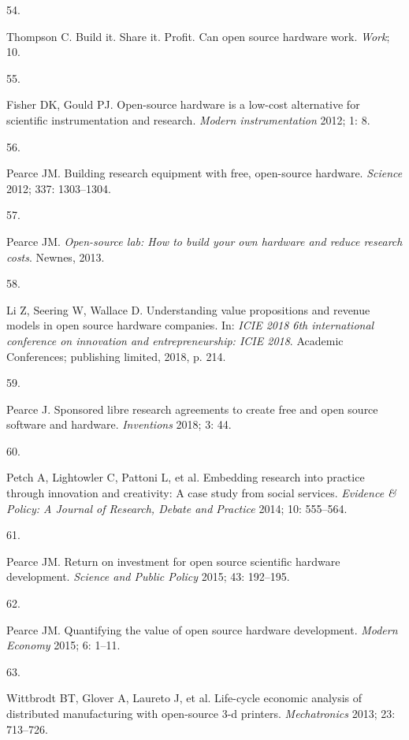 \documentclass[
  12pt,
  a4paperpaper,
  onecolumn]{article}
\newlength{\cslhangindent}
\newlength{\csllabelwidth}
\newlength{\cslentryspacingunit} %
\newenvironment{CSLReferences}[2] %
 {%
  \setlength{\parindent}{0pt}
  \ifodd #1
  \let\oldpar\par
  \def\par{\hangindent=\cslhangindent\oldpar}
  \fi
  \setlength{\parskip}{#2\cslentryspacingunit}
 }%
 {}
\newcommand{\CSLLeftMargin}[1]{\parbox[t]{\csllabelwidth}{#1}}
\newcommand{\CSLRightInline}[1]{\parbox[t]{\linewidth - \csllabelwidth}{#1}\break}
\begin{document}
\begin{CSLReferences}{0}{0}
\leavevmode{}%
\CSLLeftMargin{54. }%
\CSLRightInline{Thompson C. Build it. Share it. Profit. Can open source
hardware work. \emph{Work}; 10.}

\leavevmode{}%
\CSLLeftMargin{55. }%
\CSLRightInline{Fisher DK, Gould PJ. Open-source hardware is a low-cost
alternative for scientific instrumentation and research. \emph{Modern
instrumentation} 2012; 1: 8.}

\leavevmode{}%
\CSLLeftMargin{56. }%
\CSLRightInline{Pearce JM. Building research equipment with free,
open-source hardware. \emph{Science} 2012; 337: 1303--1304.}

\leavevmode{}%
\CSLLeftMargin{57. }%
\CSLRightInline{Pearce JM. \emph{Open-source lab: How to build your own
hardware and reduce research costs}. Newnes, 2013.}

\leavevmode{}%
\CSLLeftMargin{58. }%
\CSLRightInline{Li Z, Seering W, Wallace D. Understanding value
propositions and revenue models in open source hardware companies. In:
\emph{ICIE 2018 6th international conference on innovation and
entrepreneurship: ICIE 2018}. Academic Conferences; publishing limited,
2018, p. 214.}

\leavevmode{}%
\CSLLeftMargin{59. }%
\CSLRightInline{Pearce J. Sponsored libre research agreements to create
free and open source software and hardware. \emph{Inventions} 2018; 3:
44.}

\leavevmode{}%
\CSLLeftMargin{60. }%
\CSLRightInline{Petch A, Lightowler C, Pattoni L, et al. Embedding
research into practice through innovation and creativity: A case study
from social services. \emph{Evidence \& Policy: A Journal of Research,
Debate and Practice} 2014; 10: 555--564.}

\leavevmode{}%
\CSLLeftMargin{61. }%
\CSLRightInline{Pearce JM. Return on investment for open source
scientific hardware development. \emph{Science and Public Policy} 2015;
43: 192--195.}

\leavevmode{}%
\CSLLeftMargin{62. }%
\CSLRightInline{Pearce JM. Quantifying the value of open source hardware
development. \emph{Modern Economy} 2015; 6: 1--11.}

\leavevmode{}%
\CSLLeftMargin{63. }%
\CSLRightInline{Wittbrodt BT, Glover A, Laureto J, et al. Life-cycle
economic analysis of distributed manufacturing with open-source 3-d
printers. \emph{Mechatronics} 2013; 23: 713--726.}


\end{CSLReferences}
\end{document}

